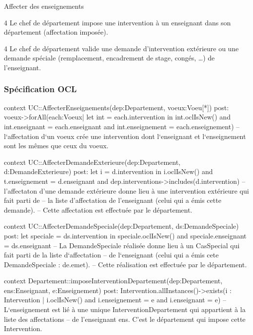 \begin{usecase}{Affecter des enseignements}
 \begin{variation}
 \item [4] Le chef de département impose une intervention à un enseignant dans son département (affectation imposée).
 \item [4] Le chef de département valide une demande d'intervention extérieure ou une demande spéciale (remplacement, encadrement de stage, congés, \dots) de l'enseignant.
 \end{variation}
\end{usecase}

\subsubsection{Spécification OCL}
\begin{ocl}
context UC::AffecterEnseignements(dep:Departement, voeux:Voeu[*])
post:
voeux->forAll(each:Voeux| let int = each.intervention in
	int.oclIsNew() and int.enseignant = each.enseignant and
	int.enseignement = each.enseignement)
	-- l`affectation d`un voeux crée une intervention dont l`enseignant et l`enseignement sont les mêmes que ceux du voeux.
 \end{ocl}

\begin{ocl}
context UC::AffecterDemandeExterieure(dep:Departement, d:DemandeExterieure)
post: let i = d.intervention in
	i.oclIsNew() and t.enseignement = d.enseignant and
	dep.interventions->includes(d.intervention)
-- l'affectaton d'une demande extérieure donne lieu à une intervention extérieure qui fait parti de 
-- la liste d'affectation de l'enseignant (celui qui a émis cette demande). 
-- Cette affectation est effectuée par le département.
\end{ocl}

\begin{ocl}
context UC::AffecterDemandeSpeciale(dep:Departement, ds:DemandeSpeciale)
post: let speciale = ds.intervention in
	speciale.oclIsNew() and speciale.enseignant = ds.enseignant
-- La DemandeSpeciale réalisée donne lieu à un CasSpecial qui fait parti de la liste d`affectation 
-- de l`enseignant (celui qui a émis cete DemandeSpeciale : de.emet). 
-- Cette réalisation est effectuée par le  département.
\end{ocl}

\begin{ocl}
context Departement::imposeInterventionDepartement(dep:Departement, ens:Enseignant, e:Enseignement)
post: Intervention.allInstances()->exists(i : Intervention |
	i.oclIsNew() and i.enseignement = e and i.enseignant = e)
-- L`enseignement est lié à une unique InterventionDepartement qui appartient à la liste des affectations 
-- de l'enseignant ens. C'est le département qui impose cette Intervention.
\end{ocl}


